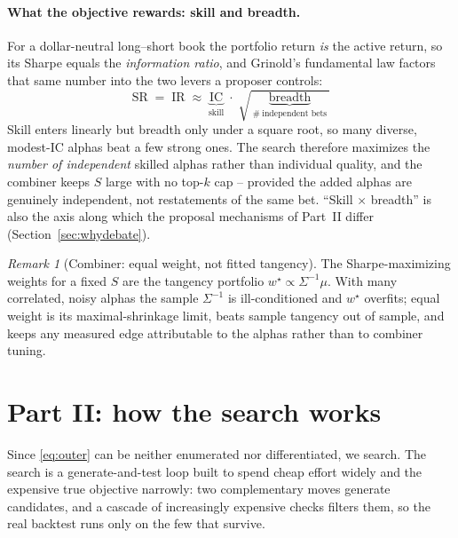 \documentclass[11pt]{article}
\theoremstyle{definition}
\theoremstyle{plain}
\theoremstyle{remark}
\newtheorem{remark}{Remark}[section]
\newcommand{\Sharpe}{\mathrm{SR}}
\newcommand{\IC}{\mathrm{IC}}
\begin{document}
\paragraph{What the objective rewards: skill and breadth.}
For a dollar-neutral long--short book the portfolio return \emph{is} the active return, so its
Sharpe equals the \emph{information ratio}, and Grinold's fundamental law factors that same number
into the two levers a proposer controls:
\begin{equation}
\boxed{\ \Sharpe \;=\; \mathrm{IR} \;\approx\; \underbrace{\IC}_{\text{skill}}\;\cdot\;\sqrt{\,\underbrace{\mathrm{breadth}}_{\#\ \text{independent bets}}\,}\ }
\label{eq:funlaw}
\end{equation}
Skill enters linearly but breadth only under a square root, so many diverse, modest-$\IC$ alphas
beat a few strong ones. The search therefore maximizes the \emph{number of independent} skilled
alphas rather than individual quality, and the combiner keeps $S$ large with no top-$k$ cap --
provided the added alphas are genuinely independent, not restatements of the same bet.
``Skill $\times$ breadth'' is also the axis along which the proposal mechanisms of Part~II differ
(Section~\ref{sec:whydebate}).

\begin{remark}[Combiner: equal weight, not fitted tangency]
The Sharpe-maximizing weights for a fixed $S$ are the tangency portfolio
$w^\star \propto \Sigma^{-1}\mu$. With many correlated, noisy alphas the sample $\Sigma^{-1}$ is
ill-conditioned and $w^\star$ overfits; equal weight is its maximal-shrinkage limit, beats sample
tangency out of sample, and keeps any measured edge attributable to the alphas rather than to
combiner tuning.
\end{remark}

\section{Part II: how the search works}
\label{sec:search}

Since \eqref{eq:outer} can be neither enumerated nor differentiated, we search. The search is
a generate-and-test loop built to spend cheap effort widely and the expensive true objective
narrowly: two complementary moves generate candidates, and a cascade of increasingly expensive
checks filters them, so the real backtest runs only on the few that survive.
\end{document}
